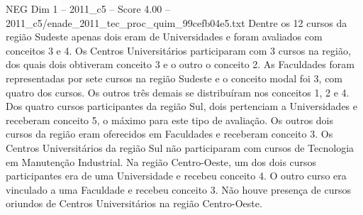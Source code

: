 \begin{textsample}{NEG Dim 1 – 2011\_c5 – Score 4.00 – 2011\_c5/enade\_2011\_tec\_proc\_quim\_99cefb04e5.txt}
Dentre os 12 cursos da região Sudeste apenas dois eram de Universidades e foram avaliados com conceitos 3 e 4.
Os Centros Universitários participaram com 3 cursos na região, dos quais dois obtiveram conceito 3 e o outro o conceito 2.
As Faculdades foram representadas por sete cursos na região Sudeste e o conceito modal foi 3, com quatro dos cursos.
Os outros três demais se distribuíram nos conceitos 1, 2 e 4.
Dos quatro cursos participantes da região Sul, dois pertenciam a Universidades e receberam conceito 5, o máximo para este tipo de avaliação.
Os outros dois cursos da região eram oferecidos em Faculdades e receberam conceito 3.
Os Centros Universitários da região Sul não participaram com cursos de Tecnologia em Manutenção Industrial.
Na região Centro-Oeste, um dos dois cursos participantes era de uma Universidade e recebeu conceito 4.
O outro curso era vinculado a uma Faculdade e recebeu conceito 3.
Não houve presença de cursos oriundos de Centros Universitários na região Centro-Oeste.

\end{textsample}
